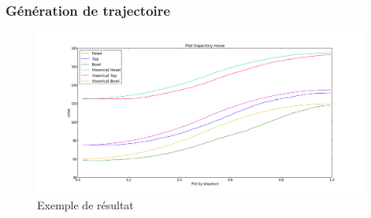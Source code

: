 \begin{frame}
  \frametitle{Génération de trajectoire}
%

            \begin{figure}
                \begin{center}
                    \includegraphics[width=11cm]{../img/TrajectoryPlot.png}
                \end{center}
                \caption{Exemple de résultat}
            \end{figure}


\end{frame}
